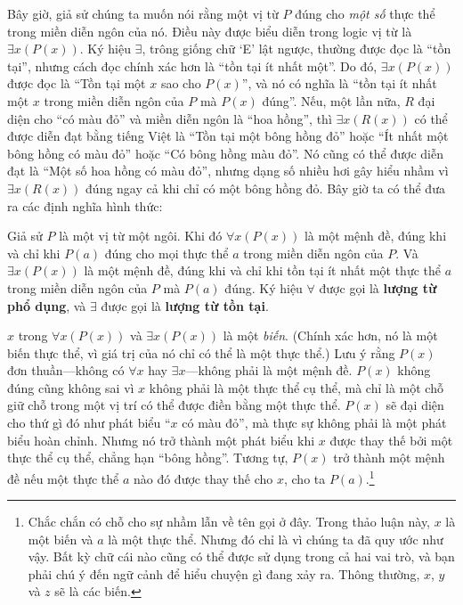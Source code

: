 Bây giờ, giả sử chúng ta muốn nói rằng một vị từ $P$ đúng cho \textit{một số} thực thể trong miền diễn ngôn của nó. Điều này được biểu diễn trong logic vị từ là $\exists x(P(x))$. Ký hiệu $\exists$, trông giống chữ `E' lật ngược, thường được đọc là ``tồn tại'', nhưng cách đọc chính xác hơn là ``tồn tại ít nhất một''. Do đó, $\exists x(P(x))$ được đọc là ``Tồn tại một $x$ sao cho $P(x)$'', và nó có nghĩa là ``tồn tại ít nhất một $x$ trong miền diễn ngôn của $P$ mà $P(x)$ đúng''. Nếu, một lần nữa, $R$ đại diện cho ``có màu đỏ'' và miền diễn ngôn là ``hoa hồng'', thì $\exists x(R(x))$ có thể được diễn đạt bằng tiếng Việt là ``Tồn tại một bông hồng đỏ'' hoặc ``Ít nhất một bông hồng có màu đỏ'' hoặc ``Có bông hồng màu đỏ''. Nó cũng có thể được diễn đạt là ``Một số hoa hồng có màu đỏ'', nhưng dạng số nhiều hơi gây hiểu nhầm vì $\exists x(R(x))$ đúng ngay cả khi chỉ có một bông hồng đỏ. Bây giờ ta có thể đưa ra các định nghĩa hình thức:

\begin{definition}
Giả sử $P$ là một vị từ một ngôi. Khi đó $\forall x(P(x))$ là một mệnh đề, đúng khi và chỉ khi $P(a)$ đúng cho mọi thực thể $a$ trong miền diễn ngôn của $P$. Và $\exists x(P(x))$ là một mệnh đề, đúng khi và chỉ khi tồn tại ít nhất một thực thể $a$ trong miền diễn ngôn của $P$ mà $P(a)$ đúng. Ký hiệu $\forall$ được gọi là \textbf{lượng từ phổ dụng}, và $\exists$ được gọi là \textbf{lượng từ tồn tại}.
\end{definition}

$x$ trong $\forall x(P(x))$ và $\exists x(P(x))$ là một \textit{biến}. (Chính xác hơn, nó là một biến thực thể, vì giá trị của nó chỉ có thể là một thực thể.) Lưu ý rằng $P(x)$ đơn thuần---không có $\forall x$ hay $\exists x$---không phải là một mệnh đề. $P(x)$ không đúng cũng không sai vì $x$ không phải là một thực thể cụ thể, mà chỉ là một chỗ giữ chỗ trong một vị trí có thể được điền bằng một thực thể. $P(x)$ sẽ đại diện cho thứ gì đó như phát biểu ``$x$ có màu đỏ'', mà thực sự không phải là một phát biểu hoàn chỉnh. Nhưng nó trở thành một phát biểu khi $x$ được thay thế bởi một thực thể cụ thể, chẳng hạn ``bông hồng''. Tương tự, $P(x)$ trở thành một mệnh đề nếu một thực thể $a$ nào đó được thay thế cho $x$, cho ta $P(a)$.\footnote{Chắc chắn có chỗ cho sự nhầm lẫn về tên gọi ở đây. Trong thảo luận này, $x$ là một biến và $a$ là một thực thể. Nhưng đó chỉ là vì chúng ta đã quy ước như vậy. Bất kỳ chữ cái nào cũng có thể được sử dụng trong cả hai vai trò, và bạn phải chú ý đến ngữ cảnh để hiểu chuyện gì đang xảy ra. Thông thường, $x$, $y$ và $z$ sẽ là các biến.}

